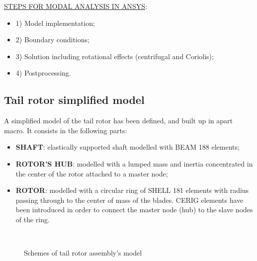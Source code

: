 \clearpage
\noindent
\underline{STEPS FOR MODAL ANALYSIS IN ANSYS}: \\
\begin{itemize}
	\item 1) Model implementation; 
	
	\item 2) Boundary conditions; 
	
	\item 3) Solution including rotational effects (centrifugal and Coriolis); 
	
	\item 4) Postprocessing. \\
\end{itemize}



\subsection*{Tail rotor simplified model}
\noindent
A simplified model of the tail rotor has been defined, and built up in apart macro. It consists in the following parts:
\begin{itemize}
	\item \textbf{SHAFT}: elastically supported shaft modelled with BEAM 188 elements;
	\item \textbf{ROTOR'S HUB}: modelled with a lumped mass and inertia concentrated in the center of the rotor attached to a master node;
	\item \textbf{ROTOR}: modelled with a circular ring of SHELL 181 elements with radius passing through to the center of mass of the blades. CERIG elements have been introduced in order to connect the master node (hub) to the slave nodes of the ring.
\end{itemize}

\medskip
\begin{figure}[h]	
	\centering
	 \quad
	\\
	\caption{Schemes of tail rotor assembly's model}
\end{figure}

